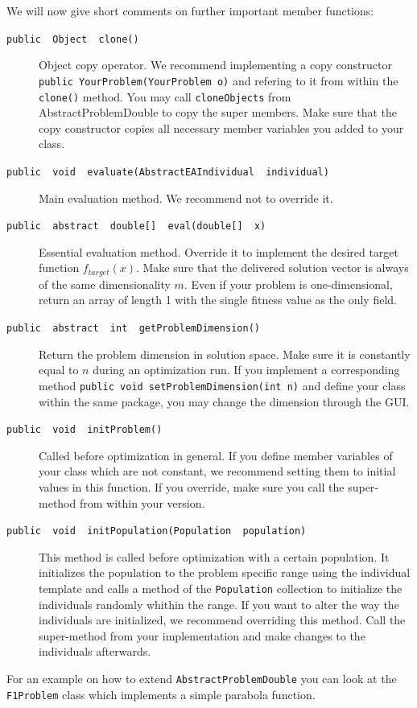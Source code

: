 We will now give short comments on further important member functions:
\begin{description}
\item [{\texttt{public ~Object ~clone()}}] Object copy operator. We recommend
implementing a copy constructor \texttt{public YourProblem(YourProblem
o)} and refering to it from within the \texttt{clone()} method. You
may call \texttt{cloneObjects} from AbstractProblemDouble to copy
the super members. Make sure that the copy constructor copies all
necessary member variables you added to your class.
\item [{\texttt{public ~void ~evaluate(AbstractEAIndividual ~individual)}}] Main
evaluation method. We recommend not to override it.
\item [{\texttt{public ~abstract ~double{[}{]} ~eval(double{[}{]} ~x)}}] Essential
evaluation method. Override it to implement the desired target function
$f_{target}(x)$. Make sure that the delivered solution vector is
always of the same dimensionality $m$. Even if your problem is one-dimensional,
return an array of length 1 with the single fitness value as the only
field.
\item [{\texttt{public ~abstract ~int ~getProblemDimension()}}] Return
the problem dimension in solution space. Make sure it is constantly
equal to $n$ during an optimization run. If you implement a corresponding
method \texttt{public void setProblemDimension(int n)} and define
your class within the same package, you may change the dimension through
the GUI.
\item [{\texttt{public ~void ~initProblem()}}] Called before optimization
in general. If you define member variables of your class which are
not constant, we recommend setting them to initial values in this
function. If you override, make sure you call the super-method from
within your version.
\item [{\texttt{public ~void ~initPopulation(Population ~population)}}] This
method is called before optimization with a certain population. It
initializes the population to the problem specific range using the
individual template and calls a method of the \texttt{Population}
collection to initialize the individuals randomly whithin the range.
If you want to alter the way the individuals are initialized, we recommend
overriding this method. Call the super-method from your implementation
and make changes to the individuals afterwards.
\end{description}
For an example on how to extend \texttt{AbstractProblemDouble} you
can look at the \texttt{F1Problem} class which implements a simple
parabola function.


